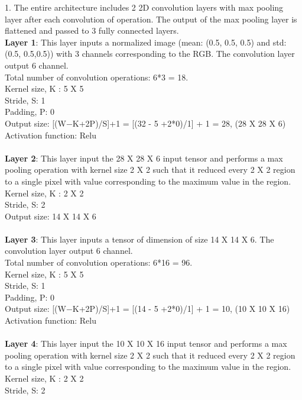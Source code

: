 \documentclass[answers]{exam}
\begin{document}
\begin{solution}
1. 
The entire architecture includes 2 2D convolution layers with max pooling layer after each convolution of operation. The output of the max pooling layer is flattened and passed to 3 fully connected layers.\\
\textbf{Layer 1}: This layer inputs a normalized image (mean: (0.5, 0.5, 0.5) and std: (0.5, 0.5,0.5)) with 3 channels corresponding to the RGB. The convolution layer output 6 channel. \\
Total number of convolution operations:  6*3 = 18.\\
Kernel size, K : 5 X 5\\
Stride, S: 1\\
Padding, P: 0\\
Output size: [(W−K+2P)/S]+1 = [(32 - 5 +2*0)/1] + 1 = 28, (28 X 28 X 6)\\
Activation function: Relu\\
\\
\textbf{Layer 2}: This layer input the 28 X 28 X 6 input tensor and performs a max pooling operation with kernel size 2 X 2 such that it reduced every 2 X 2 region to a single pixel with value corresponding to the maximum value in the region.\\
Kernel size, K : 2 X 2\\
Stride, S: 2\\
Output size: 14 X 14 X 6\\
\\
\textbf{Layer 3}: This layer inputs a tensor of dimension of size 14 X 14 X 6. The convolution layer output 6 channel.\\ 
Total number of convolution operations:  6*16 = 96.\\
Kernel size, K : 5 X 5\\
Stride, S: 1\\
Padding, P: 0\\
Output size: [(W−K+2P)/S]+1 = [(14 - 5 +2*0)/1] + 1 = 10, (10 X 10 X 16)\\
Activation function: Relu\\
\\
\textbf{Layer 4}: This layer input the 10 X 10 X 16 input tensor and performs a max pooling operation with kernel size 2 X 2 such that it reduced every 2 X 2 region to a single pixel with value corresponding to the maximum value in the region.\\
Kernel size, K : 2 X 2\\
Stride, S: 2\\

\end{solution}
\end{document}
